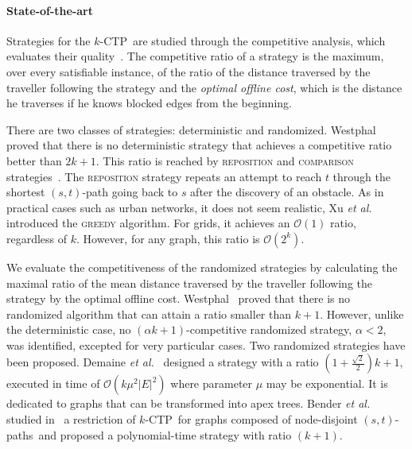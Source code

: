 \documentclass[preprint]{elsarticle}
\newcommand{\kctp}{$k$-CTP}
\newcommand{\card}[1]{\left| #1 \right|}
\newcommand{\stpath}{$(s,t)$-path}
\newcommand{\stpaths}{$(s,t)$-paths}
\begin{document}
\paragraph{State-of-the-art}
Strategies for the \kctp ~are studied through the competitive analysis, which evaluates their quality~\cite{BoEl98}. The competitive ratio of a strategy is the maximum, over every satisfiable instance, of the ratio of the distance traversed by the traveller following the strategy and the \textit{optimal offline cost}, which is the distance he traverses if he knows blocked edges from the beginning. 

There are two classes of strategies: deterministic and randomized. Westphal~\cite{We08} proved that there is no deterministic strategy that achieves a competitive ratio better than $2k+1$. This ratio is reached by \textsc{reposition} and \textsc{comparison} strategies~\cite{We08,XuHuSuZh09}. The \textsc{reposition} strategy repeats an attempt to reach $t$ through the shortest \stpath{} going back to $s$ after the discovery of an obstacle. As in practical cases such as urban networks, it does not seem realistic, Xu {\em et al.\/}~\cite{XuHuSuZh09} introduced the \textsc{greedy} algorithm. For grids, it achieves an $\mathcal{O}\left(1\right)$ ratio, regardless of $k$. However, for any graph, this ratio is $\mathcal{O}\left(2^k\right)$.

We evaluate the competitiveness of the randomized strategies by calculating the maximal ratio of the mean distance traversed by the traveller following the strategy by the optimal offline cost. Westphal~\cite{We08} proved that there is no randomized algorithm that can attain a ratio smaller than $k+1$. However, unlike the deterministic case, no $\left(\alpha k+1\right)$-competitive randomized strategy, $\alpha < 2$, was identified, excepted for very particular cases. Two randomized strategies have been proposed. Demaine {\em et al.\/}~\cite{DeHuLiSa14} designed a strategy with a ratio $\left(1+\frac{\sqrt{2}}{2}\right)k+1$, executed in time of $\mathcal{O}\left(k\mu^2\card{E}^2\right)$ where parameter $\mu$ may be exponential. It is dedicated to graphs that can be transformed into apex trees. 
Bender {\em et al.\/} studied in~\cite{BeWe15} a restriction of \kctp ~for graphs composed of node-disjoint \stpaths ~and proposed a polynomial-time strategy with ratio $\left(k+1\right)$. 
\end{document}
